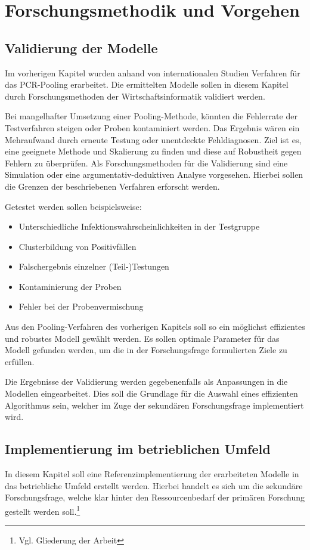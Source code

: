 
\chapter{Forschungsmethodik und Vorgehen}
\section{Validierung der Modelle}
Im vorherigen Kapitel wurden anhand von internationalen Studien Verfahren für das PCR-Pooling erarbeitet.
Die ermittelten Modelle sollen in diesem Kapitel durch Forschungsmethoden der Wirtschaftsinformatik validiert werden.

Bei mangelhafter Umsetzung einer Pooling-Methode, könnten die Fehlerrate der Testverfahren steigen oder Proben kontaminiert werden.
Das Ergebnis wären ein Mehraufwand durch erneute Testung oder unentdeckte Fehldiagnosen.
Ziel ist es, eine geeignete Methode und Skalierung zu finden und diese auf Robustheit gegen Fehlern zu überprüfen.
Als Forschungsmethoden für die Validierung sind eine Simulation oder eine argumentativ-deduktiven Analyse vorgesehen.
Hierbei sollen die Grenzen der beschriebenen Verfahren erforscht werden.

Getestet werden sollen beispielsweise:
\begin{itemize}
	\setlength{\itemsep}{-8pt}
	\item Unterschiedliche Infektionswahrscheinlichkeiten in der Testgruppe
	\item Clusterbildung von Positivfällen
	\item Falschergebnis einzelner (Teil-)Testungen
	\item Kontaminierung der Proben
	\item Fehler bei der Probenvermischung
\end{itemize}

Aus den Pooling-Verfahren des vorherigen Kapitels soll so ein möglichst effizientes und robustes Modell gewählt werden.
Es sollen optimale Parameter für das Modell gefunden werden, um die in der Forschungsfrage formulierten Ziele zu erfüllen.

Die Ergebnisse der Validierung werden gegebenenfalls als Anpassungen in die Modellen eingearbeitet.
Dies soll die Grundlage für die Auswahl eines effizienten Algorithmus sein, welcher im Zuge der sekundären Forschungsfrage implementiert wird.

\section{Implementierung im betrieblichen Umfeld}
In diesem Kapitel soll eine Referenzimplementierung der erarbeiteten Modelle in das betriebliche Umfeld erstellt werden.
Hierbei handelt es sich um die sekundäre Forschungsfrage, welche klar hinter den Ressourcenbedarf der primären Forschung gestellt werden soll.\footnote{Vgl. Gliederung der Arbeit}

